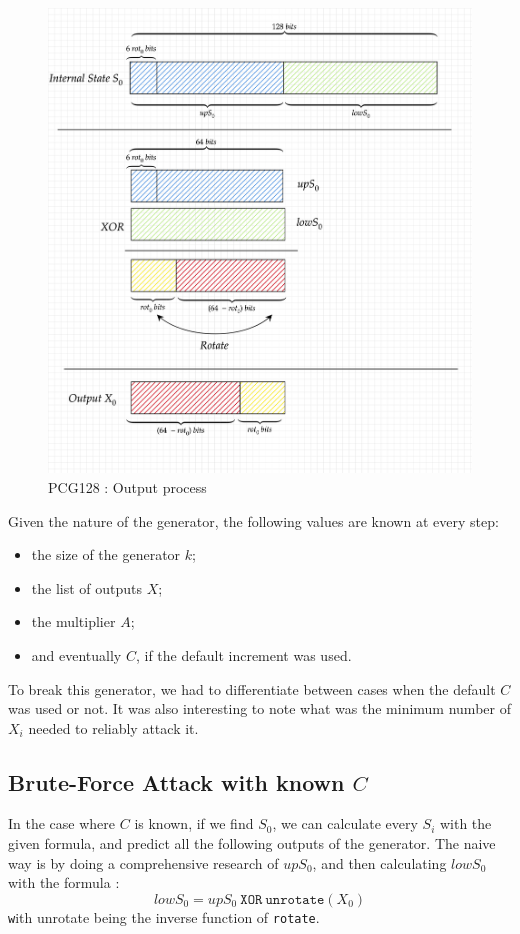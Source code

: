 \documentclass[preprint]{iacrtrans}
\begin{document}
\begin{figure}[h!]
    \centering
    \includegraphics[width=0.75\linewidth]{pictures/PCG128.png}
    \caption{PCG128 : Output process}
    \label{pcg128out}
\end{figure}



Given the nature of the generator, the following values are known at every step:
\begin{itemize}
    \item the size of the generator $k$;
    \item the list of outputs $X$;
    \item the multiplier $A$;
    \item and eventually $C$, if the default increment was used. 
\end{itemize}

To break this generator, we had to differentiate between cases when the default $C$ was used or not. It was also interesting to note what was the minimum number of $X_i$ needed to reliably attack it.

\subsection{Brute-Force Attack with known $C$}
In the case where $C$ is known, if we find $S_0$, we can calculate every $S_i$ with the given formula, and predict all the following outputs of the generator. The naive way is by doing a comprehensive research of $upS_0$, and then calculating $lowS_0$ with the formula :\\
\begin{equation}
    lowS_0 = upS_0\ \mathtt{XOR}\ \mathtt{unrotate}(X_0)
\end{equation}
\texttt with {unrotate} being the inverse function of \texttt{rotate}.\\
\end{document}
